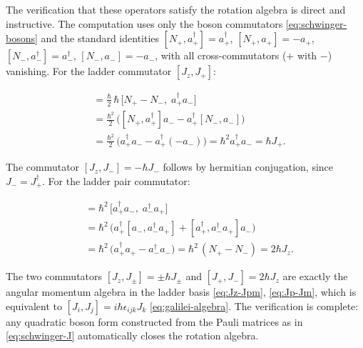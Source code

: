 The verification that these operators satisfy the rotation algebra is direct and instructive. The computation uses only the boson commutators \eqref{eq:schwinger-bosons} and the standard identities $[N_+,a_+^\dagger] = a_+^\dagger$, $[N_+,a_+] = -a_+$, $[N_-,a_-^\dagger] = a_-^\dagger$, $[N_-,a_-] = -a_-$, with all cross-commutators ($+$ with $-$) vanishing. For the ladder commutator $[J_z, J_+]$:
\begin{linenomath}
  \begin{align*}
    [J_z, J_+]
    &= \frac{\hbar}{2}\,\hbar\,
       \bigl[N_+ - N_-,\; a_+^\dagger a_-\bigr] \\
    &= \frac{\hbar^2}{2}\,
       \bigl([N_+, a_+^\dagger]a_- - a_+^\dagger[N_-, a_-]\bigr) \\
    &= \frac{\hbar^2}{2}\,
       \bigl(a_+^\dagger a_- - a_+^\dagger(-a_-)\bigr)
       = \hbar^2 a_+^\dagger a_-
       = \hbar J_+ .
  \end{align*}
\end{linenomath}
The commutator $[J_z, J_-] = -\hbar J_-$ follows by hermitian conjugation, since $J_- = J_+^\dagger$. For the ladder pair commutator:
\begin{linenomath}
  \begin{align*}
    [J_+, J_-]
    &= \hbar^2\,
       \bigl[a_+^\dagger a_-,\; a_-^\dagger a_+\bigr] \\
    &= \hbar^2\,
       \bigl(a_+^\dagger[a_-, a_-^\dagger a_+]
            + [a_+^\dagger, a_-^\dagger a_+]a_-\bigr) \\
    &= \hbar^2\,
       \bigl(a_+^\dagger a_+ - a_-^\dagger a_-\bigr)
       = \hbar^2\,(N_+ - N_-)
       = 2\hbar J_z .
  \end{align*}
\end{linenomath}
The two commutators $[J_z,J_\pm]=\pm\hbar J_\pm$ and $[J_+,J_-]=2\hbar J_z$ are exactly the angular momentum algebra in the ladder basis \eqref{eq:Jz-Jpm}, \eqref{eq:Jp-Jm}, which is equivalent to $[J_i,J_j]=i\hbar\epsilon_{ijk}J_k$ \eqref{eq:galilei-algebra}. The verification is complete: any quadratic boson form constructed from the Pauli matrices as in \eqref{eq:schwinger-J} automatically closes the rotation algebra.


